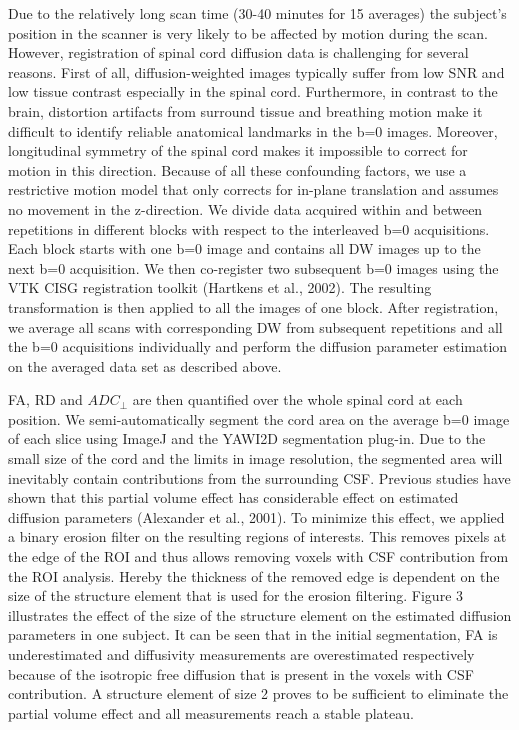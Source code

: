 Due to the relatively long scan time (30-40 minutes for 15 averages) the subject’s position in the scanner is very likely to be affected by motion during the scan. However, registration of spinal cord diffusion data is challenging for several reasons. First of all, diffusion-weighted images typically suffer from low SNR and low tissue contrast especially in the spinal cord. Furthermore, in contrast to the brain, distortion artifacts from surround tissue and breathing motion make it difficult to identify reliable anatomical landmarks in the b=0 images. Moreover, longitudinal symmetry of the spinal cord makes it impossible to correct for motion in this direction. Because of all these confounding factors, we use a restrictive motion model that only corrects for in-plane translation and assumes no movement in the z-direction. We divide data acquired within and between repetitions in different blocks with respect to the interleaved b=0 acquisitions. Each block starts with one b=0 image and contains all DW images up to the next b=0 acquisition. We then co-register two subsequent b=0 images using the VTK CISG registration toolkit (Hartkens et al., 2002). The resulting transformation is then applied to all the images of one block. After registration, we average all scans with corresponding DW from subsequent repetitions and all the b=0 acquisitions individually and perform the diffusion parameter estimation on the averaged data set as described above.

FA, RD and $ADC_\perp$ are then quantified over the whole spinal cord at each position. We semi-automatically segment the cord area on the average b=0 image of each slice using ImageJ  and the YAWI2D  segmentation plug-in. Due to the small size of the cord and the limits in image resolution, the segmented area will inevitably contain contributions from the surrounding CSF. Previous studies have shown that this partial volume effect has considerable effect on estimated diffusion parameters (Alexander et al., 2001). To minimize this effect, we applied a binary erosion filter on the resulting regions of interests. This removes pixels at the edge of the ROI and thus allows removing voxels with CSF contribution from the ROI analysis. Hereby the thickness of the removed edge is dependent on the size of the structure element that is used for the erosion filtering. Figure 3 illustrates the effect of the size of the structure element on the estimated diffusion parameters in one subject. It can be seen that in the initial segmentation, FA is underestimated and diffusivity measurements are overestimated respectively because of the isotropic free diffusion that is present in the voxels with CSF contribution. A structure element of size 2 proves to be sufficient to eliminate the partial volume effect and all measurements reach a stable plateau.

